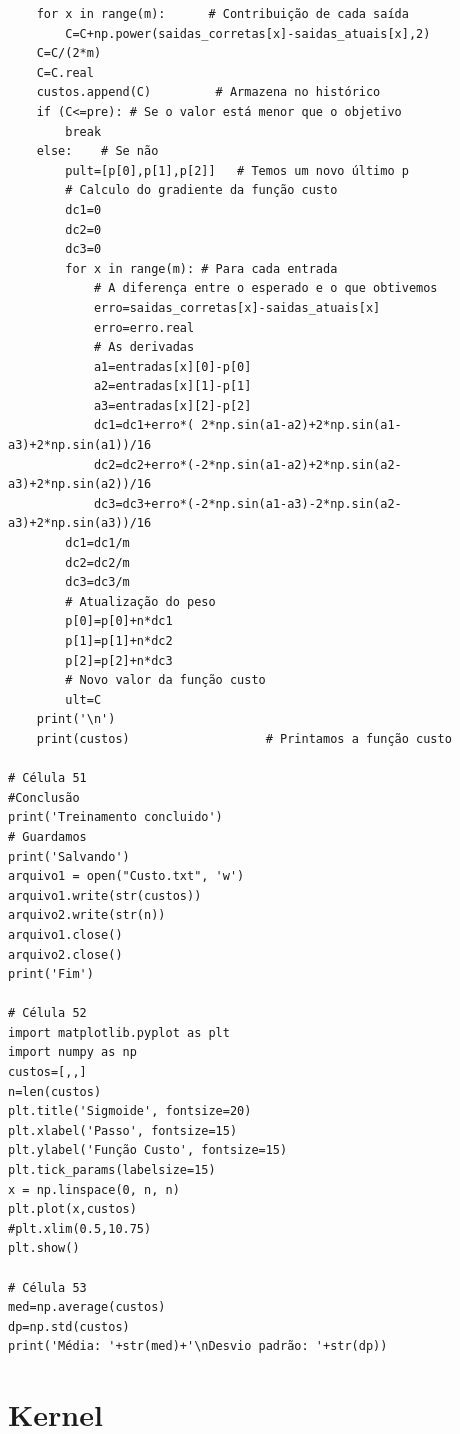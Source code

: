 \begin{verbatim}
    for x in range(m):      # Contribuição de cada saída
        C=C+np.power(saidas_corretas[x]-saidas_atuais[x],2)
    C=C/(2*m)
    C=C.real
    custos.append(C)         # Armazena no histórico
    if (C<=pre): # Se o valor está menor que o objetivo
        break
    else:    # Se não
        pult=[p[0],p[1],p[2]]   # Temos um novo último p
        # Calculo do gradiente da função custo
        dc1=0
        dc2=0
        dc3=0
        for x in range(m): # Para cada entrada
            # A diferença entre o esperado e o que obtivemos
            erro=saidas_corretas[x]-saidas_atuais[x]
            erro=erro.real
            # As derivadas
            a1=entradas[x][0]-p[0]
            a2=entradas[x][1]-p[1]
            a3=entradas[x][2]-p[2]
            dc1=dc1+erro*( 2*np.sin(a1-a2)+2*np.sin(a1-a3)+2*np.sin(a1))/16
            dc2=dc2+erro*(-2*np.sin(a1-a2)+2*np.sin(a2-a3)+2*np.sin(a2))/16
            dc3=dc3+erro*(-2*np.sin(a1-a3)-2*np.sin(a2-a3)+2*np.sin(a3))/16
        dc1=dc1/m
        dc2=dc2/m
        dc3=dc3/m
        # Atualização do peso
        p[0]=p[0]+n*dc1
        p[1]=p[1]+n*dc2
        p[2]=p[2]+n*dc3
        # Novo valor da função custo
        ult=C
    print('\n')
    print(custos)                   # Printamos a função custo

# Célula 51
#Conclusão
print('Treinamento concluido')
# Guardamos
print('Salvando')
arquivo1 = open("Custo.txt", 'w')
arquivo1.write(str(custos))
arquivo2.write(str(n))
arquivo1.close()
arquivo2.close()
print('Fim')

# Célula 52
import matplotlib.pyplot as plt
import numpy as np
custos=[,,]
n=len(custos)
plt.title('Sigmoide', fontsize=20)
plt.xlabel('Passo', fontsize=15)
plt.ylabel('Função Custo', fontsize=15)
plt.tick_params(labelsize=15)
x = np.linspace(0, n, n)
plt.plot(x,custos)
#plt.xlim(0.5,10.75)
plt.show()

# Célula 53
med=np.average(custos)
dp=np.std(custos)
print('Média: '+str(med)+'\nDesvio padrão: '+str(dp))
\end{verbatim}
\section{Kernel}

